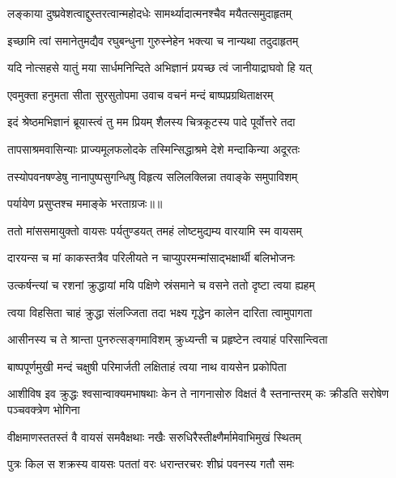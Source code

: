 \twolineshloka
{लङ्काया दुष्प्रवेशत्वाद्दुस्तरत्वान्महोदधेः}
{सामर्थ्यादात्मनश्चैव मयैतत्समुदाहृतम्} %

\twolineshloka
{इच्छामि त्वां समानेतुमद्यैव रघुबन्धुना}
{गुरुस्नेहेन भक्त्या च नान्यथा तदुदाहृतम्} %

\twolineshloka
{यदि नोत्सहसे यातुं मया सार्धमनिन्दिते}
{अभिज्ञानं प्रयच्छ त्वं जानीयाद्राघवो हि यत्} %

\twolineshloka
{एवमुक्ता हनुमता सीता सुरसुतोपमा}
{उवाच वचनं मन्दं बाष्पप्रग्रथिताक्षरम्} %

\twolineshloka
{इदं श्रेष्ठमभिज्ञानं ब्रूयास्त्वं तु मम प्रियम्}
{शैलस्य चित्रकूटस्य पादे पूर्वोत्तरे तदा} %

\twolineshloka
{तापसाश्रमवासिन्याः प्राज्यमूलफलोदके}
{तस्मिन्सिद्धाश्रमे देशे मन्दाकिन्या अदूरतः} %

\twolineshloka
{तस्योपवनषण्डेषु नानापुष्पसुगन्धिषु}
{विहृत्य सलिलक्लिन्ना तवाङ्के समुपाविशम्} %

{पर्यायेण प्रसुप्तश्च ममाङ्के भरताग्रजः॥॥} %

\addtocounter{shlokacount}{1}

\twolineshloka
{ततो मांससमायुक्तो वायसः पर्यतुण्डयत्}
{तमहं लोष्टमुद्यम्य वारयामि स्म वायसम्} %

\twolineshloka
{दारयन्स च मां काकस्तत्रैव परिलीयते}
{न चाप्युपरमन्मांसाद्भक्षार्थी बलिभोजनः} %

\twolineshloka
{उत्कर्षन्त्यां च रशनां क्रुद्धायां मयि पक्षिणे}
{स्रंसमाने च वसने ततो दृष्टा त्वया ह्यहम्} %

\twolineshloka
{त्वया विहसिता चाहं क्रुद्धा संलज्जिता तदा}
{भक्ष्य गृद्धेन कालेन दारिता त्वामुपागता} %

\twolineshloka
{आसीनस्य च ते श्रान्ता पुनरुत्सङ्गमाविशम्}
{क्रुध्यन्ती च प्रहृष्टेन त्वयाहं परिसान्त्विता} %

\twolineshloka
{बाष्पपूर्णमुखी मन्दं चक्षुषी परिमार्जती}
{लक्षिताहं त्वया नाथ वायसेन प्रकोपिता} %

\threelineshloka
{आशीविष इव क्रुद्धः श्वसान्वाक्यमभाषथाः}
{केन ते नागनासोरु विक्षतं वै स्तनान्तरम्}
{कः क्रीडति सरोषेण पञ्चवक्त्रेण भोगिना} %

\twolineshloka
{वीक्षमाणस्ततस्तं वै वायसं समवैक्षथाः}
{नखैः सरुधिरैस्तीक्ष्णैर्मामेवाभिमुखं स्थितम्} %

\twolineshloka
{पुत्रः किल स शक्रस्य वायसः पततां वरः}
{धरान्तरचरः शीघ्रं पवनस्य गतौ समः} %


